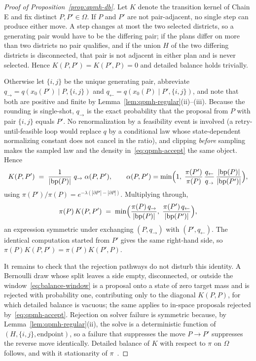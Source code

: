 \documentclass[11pt]{article}
\begin{document}
\begin{proof}[Proof of Proposition~\ref{prop:qpmh-db}]
Let $K$ denote the transition kernel of Chain E and fix distinct
$P, P' \in \Omega$. If $P$ and $P'$ are not pair-adjacent, no single
step can produce either move. A step changes at most the two selected
districts, so a generating pair would have to be the differing pair;
if the plans differ on more than two districts no pair qualifies, and
if the union $H$ of the two differing districts is disconnected, that
pair is not adjacent in either plan and is never selected. Hence
$K(P, P') = K(P', P) = 0$ and detailed balance holds trivially.

Otherwise let $\{i,j\}$ be the unique generating pair, abbreviate
$q_{\to} = q(x_0(P') \mid P, \{i,j\})$ and
$q_{\gets} = q(x_0(P) \mid P', \{i,j\})$, and note that both are
positive and finite by Lemma~\ref{lem:qpmh-regular}(ii)--(iii).
Because the rounding is single-shot, $q_{\to}$ is the exact
probability that the proposal from $P$ with pair $\{i,j\}$ equals
$P'$. No renormalization by a feasibility event is involved (a
retry-until-feasible loop would replace $q$ by a conditional law
whose state-dependent normalizing constant does not cancel in the
ratio), and clipping \emph{before} sampling makes the sampled law and
the density in~\eqref{eq:qpmh-accept} the same object. Hence
\[
  K(P, P') \;=\; \frac{1}{|\mathrm{bp}(P)|}\; q_{\to}\;
  \alpha(P, P'), \qquad
  \alpha(P, P') = \min\Bigl(1,\;
  \frac{\pi(P')}{\pi(P)}\,
  \frac{q_{\gets}}{q_{\to}}\,
  \frac{|\mathrm{bp}(P)|}{|\mathrm{bp}(P')|}\Bigr),
\]
using $\pi(P')/\pi(P) = e^{-\lambda(|\partial P'| - |\partial P|)}$.
Multiplying through,
\[
  \pi(P)\, K(P, P') \;=\;
  \min\Bigl(
  \frac{\pi(P)\, q_{\to}}{|\mathrm{bp}(P)|},\;
  \frac{\pi(P')\, q_{\gets}}{|\mathrm{bp}(P')|}
  \Bigr),
\]
an expression symmetric under exchanging $(P, q_{\to})$ with
$(P', q_{\gets})$. The identical computation started from $P'$ gives
the same right-hand side, so
$\pi(P) K(P, P') = \pi(P') K(P', P)$.

It remains to check that the rejection pathways do not disturb this
identity. A Bernoulli draw whose split leaves a side empty,
disconnected, or outside the window~\eqref{eq:balance-window} is a
proposal onto a state of zero target mass and is rejected with
probability one, contributing only to the diagonal $K(P, P)$, for
which detailed balance is vacuous; the same applies to in-space
proposals rejected by~\eqref{eq:qpmh-accept}. Rejection on solver
failure is symmetric because, by
Lemma~\ref{lem:qpmh-regular}(ii), the solve is a deterministic
function of $(H, \{i,j\}, \text{endpoint})$, so a failure that
suppresses the move $P \to P'$ suppresses the reverse move
identically. Detailed balance of $K$ with respect to $\pi$ on
$\Omega$ follows, and with it stationarity of
$\pi$~\cite{tierney1998note}.
\end{proof}
\end{document}
